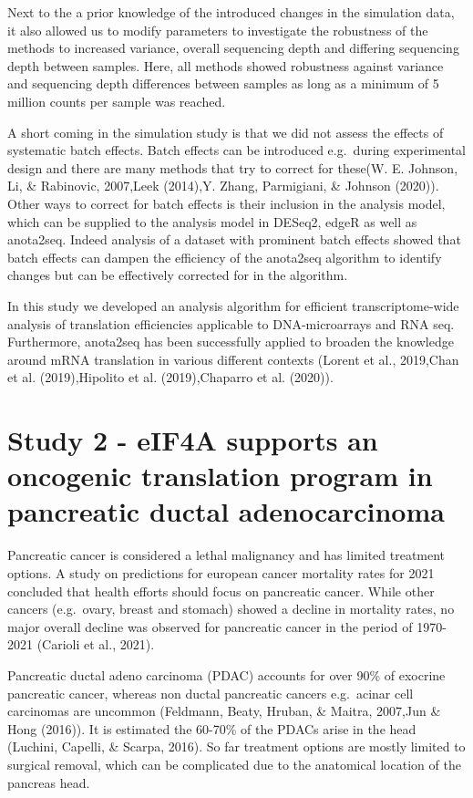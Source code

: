 \documentclass[12pt,openany]{book}
\begin{document}
Next to the a prior knowledge of the introduced changes in the
simulation data, it also allowed us to modify parameters to investigate
the robustness of the methods to increased variance, overall sequencing
depth and differing sequencing depth between samples. Here, all methods
showed robustness against variance and sequencing depth differences
between samples as long as a minimum of 5 million counts per sample was
reached.

A short coming in the simulation study is that we did not assess the
effects of systematic batch effects. Batch effects can be introduced
e.g.~during experimental design and there are many methods that try to
correct for these(W. E. Johnson, Li, \& Rabinovic, 2007,Leek (2014),Y.
Zhang, Parmigiani, \& Johnson (2020)). Other ways to correct for batch
effects is their inclusion in the analysis model, which can be supplied
to the analysis model in DESeq2, edgeR as well as anota2seq. Indeed
analysis of a dataset with prominent batch effects showed that batch
effects can dampen the efficiency of the anota2seq algorithm to identify
changes but can be effectively corrected for in the algorithm.

In this study we developed an analysis algorithm for efficient
transcriptome-wide analysis of translation efficiencies applicable to
DNA-microarrays and RNA seq. Furthermore, anota2seq has been
successfully applied to broaden the knowledge around mRNA translation in
various different contexts (Lorent et al., 2019,Chan et al.
(2019),Hipolito et al. (2019),Chaparro et al. (2020)).

\section{Study 2 - eIF4A supports an oncogenic translation program in pancreatic ductal adenocarcinoma}

Pancreatic cancer is considered a lethal malignancy and has limited
treatment options. A study on predictions for european cancer mortality
rates for 2021 concluded that health efforts should focus on pancreatic
cancer. While other cancers (e.g.~ovary, breast and stomach) showed a
decline in mortality rates, no major overall decline was observed for
pancreatic cancer in the period of 1970-2021 (Carioli et al., 2021).

Pancreatic ductal adeno carcinoma (PDAC) accounts for over 90\% of
exocrine pancreatic cancer, whereas non ductal pancreatic cancers
e.g.~acinar cell carcinomas are uncommon (Feldmann, Beaty, Hruban, \&
Maitra, 2007,Jun \& Hong (2016)). It is estimated the 60-70\% of the
PDACs arise in the head (Luchini, Capelli, \& Scarpa, 2016). So far
treatment options are mostly limited to surgical removal, which can be
complicated due to the anatomical location of the pancreas head.
\end{document}
